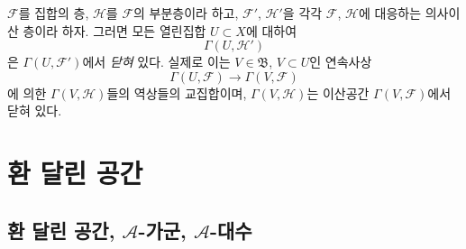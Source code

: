 \begin{env}[3.8.3]
\label{0.3.8.3-ko}
$\mathcal F$를 집합의 층, $\mathcal H$를 $\mathcal F$의 부분층이라 하고, $\mathcal F'$, $\mathcal H'$을 각각 $\mathcal F$, $\mathcal H$에 대응하는 의사이산 층이라 하자. 그러면 모든 열린집합 $U\subset X$에 대하여
\[
  \Gamma(U,\mathcal H')
\]
은 $\Gamma(U,\mathcal F')$에서 \emph{닫혀} 있다. 실제로 이는 $V\in\mathfrak B$, $V\subset U$인 연속사상
\[
  \Gamma(U,\mathcal F)\longrightarrow\Gamma(V,\mathcal F)
\]
에 의한 $\Gamma(V,\mathcal H)$들의 역상들의 교집합이며, $\Gamma(V,\mathcal H)$는 이산공간 $\Gamma(V,\mathcal F)$에서 닫혀 있다.
\end{env}

\section{환 달린 공간}
\label{section:0.4-ko}

\subsection{환 달린 공간, $\mathcal A$-가군, $\mathcal A$-대수}
\label{subsection:0.4.1-ko}

